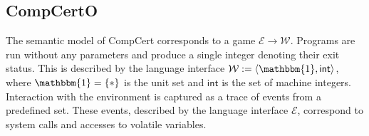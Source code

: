 \documentclass[sigplan,10pt,review]{acmart}
\newcommand{\kw}[1]{\ensuremath{ \mathsf{#1} }}
\begin{document}
%
%
%
%
%

\subsection{CompCertO} \label{sec:mainideas:compcerto} %

The semantic model of CompCert corresponds to
a game $\mathcal{E} \rightarrow \mathcal{W}$.
Programs are run without any parameters
and produce a single integer denoting their exit status.
This is described by the language interface
$\mathcal{W} := \langle \mathbbm{1}, \kw{int} \rangle$,
where $\mathbbm{1} = \{ * \}$ is the unit set
and $\kw{int}$ is the set of machine integers.
Interaction with the environment
is captured as a trace of events from a predefined set.
These events,
described by the language interface $\mathcal{E}$,
correspond to system calls and accesses to volatile variables.
\end{document}
